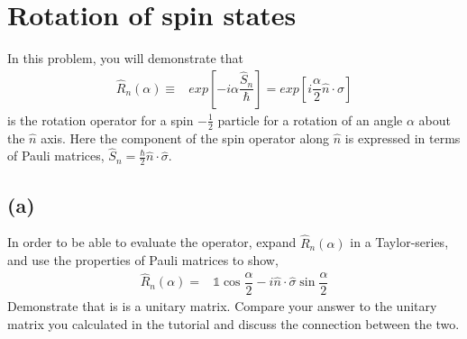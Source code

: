 \documentclass[12pt, a4paper]{article}
\begin{document}
\section{Rotation of spin states}
In this problem, you will demonstrate that
\begin{align*}
\hat{R}_n (\alpha) \equiv& exp\left[-i\alpha\dfrac{\hat{S}_n}{\hbar}\right] = exp\left[i\dfrac{\alpha}{2}\hat{n}\cdot{\sigma}\right]
\end{align*}
is the rotation operator for a spin $-\frac{1}{2}$ particle for a rotation of an angle $\alpha$ about the $\hat{n}$ axis. Here the component of the spin operator along $\hat{n}$ is expressed in terms of Pauli matrices, $ \hat{S}_n = \frac{\hbar}{2}\hat{n}\cdot\hat{\sigma}$.

\subsection*{(a)}
In order to be able to evaluate the operator, expand $\hat{R}_n(\alpha)$ in a Taylor-series, and use the properties of Pauli matrices to show,
\begin{align*}
\hat{R}_n (\alpha) =& \mathds{1} \cos\dfrac{\alpha}{2}-i\hat{n}\cdot\hat{\sigma}\sin\dfrac{\alpha}{2}
\end{align*}
Demonstrate that is is a unitary matrix. Compare your answer to the unitary matrix you calculated in the tutorial and discuss the connection between the two. 
\end{document}
